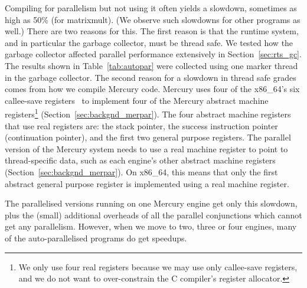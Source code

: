 Compiling for parallelism but not using it
often yields a slowdown, sometimes as high as 50\% (for matrixmult).
(We observe such slowdowns for other programs as well.)
There are two reasons for this.
The first reason is that the runtime system, and in particular the garbage
collector, must be thread safe.
We tested how the garbage collector affected parallel performance
extensively in Section~\ref{sec:rts_gc}.
The results shown in Table~\ref{tab:autopar} were collected using one marker
thread in the garbage collector.
The second reason for a slowdown in thread safe grades comes from how we
compile Mercury code.
Mercury uses four
of the x86\_64's six callee-save registers~\citep{sysv-abi} to implement
four of the Mercury abstract machine registers\footnote{
    We only use four real registers because we may use only 
    callee-save registers,
    and we do not want to over-constrain the C compiler's register
    allocator.}
(Section~\ref{sec:backgnd_merpar}).
The four abstract machine registers that use real registers are:
the stack pointer,
the success instruction pointer (continuation pointer),
and the first two general purpose registers.
The parallel version of the Mercury system
needs to use a real machine register
to point to thread-specific data,
such as each engine's other abstract machine registers
(Section~\ref{sec:backgnd_merpar}).
On x86\_64, this means that only the first abstract general purpose register
is implemented using a real machine register.

The parallelised versions running on one Mercury engine get
only this slowdown,
plus the (small) additional overheads of all the parallel conjunctions
which cannot get any parallelism.
However, when we move to two, three or four engines,
many of the auto-parallelised programs do get speedups.

